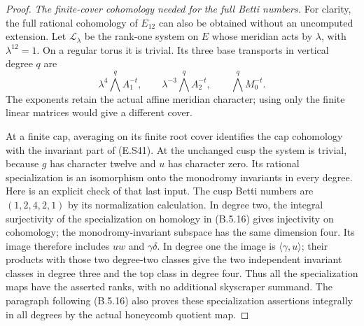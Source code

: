 \begin{proof}
\emph{The finite-cover cohomology needed for the full Betti numbers.}
For clarity, the full rational cohomology of $E_{12}$
can also be obtained without an uncomputed extension.
Let $\mathcal L_\lambda$ be the rank-one system on $E$
whose meridian acts by $\lambda$, with $\lambda^{12}=1$.
On a regular torus it is trivial. Its three base transports
in vertical degree $q$ are
\[
 \lambda^4\bigwedge^q A_1^{-t},\qquad
 \lambda^{-3}\bigwedge^q A_2^{-t},\qquad
                         \bigwedge^q M_0^{-t}.
 \tag{E.S41}
\]
The exponents retain the actual affine meridian character;
using only the finite linear matrices would give a different
cover.

At a finite cap, averaging on its finite root cover
identifies the cap cohomology with the invariant part of
(E.S41). At the unchanged cusp the system is trivial,
because $g$ has character twelve and $u$ has character zero.
Its rational specialization is an isomorphism onto the
monodromy invariants in every degree. Here is an explicit
check of that last input. The cusp Betti numbers are
$(1,2,4,2,1)$ by its normalization calculation. In degree
two, the integral surjectivity of the specialization on
homology in (B.5.16) gives injectivity on cohomology;
the monodromy-invariant subspace has the same dimension
four. Its image therefore includes $uw$ and $\gamma\delta$.
In degree one the image is $\langle\gamma,u\rangle$;
their products with those two degree-two classes give the
two independent invariant classes in degree three and
the top class in degree four. Thus all the specialization
maps have the asserted ranks, with no additional
skyscraper summand. The paragraph following (B.5.16)
also proves these specialization assertions integrally
in all degrees by the actual honeycomb quotient map.


\end{proof}
